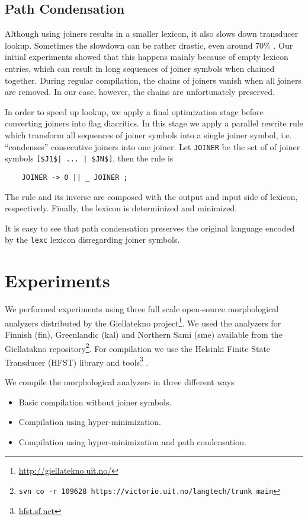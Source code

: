 \documentclass[11pt]{article}
\begin{document}
\subsection{Path Condensation}

Although using joiners results in a smaller lexicon, it also slows down transducer lookup. Sometimes the slowdown can be rather drastic, even around 70\% \cite{drobac2014}.  Our initial experiments showed that this happens mainly because of empty lexicon entries, which can result in long sequences of joiner symbols when chained together. During regular compilation, the chains of joiners vanish when all joiners are removed. In our case, however, the chains are unfortunately preserved.

In order to speed up lookup, we apply a final optimization stage before converting joiners into flag diacritics. In this stage we apply a parallel rewrite rule which transform all sequences of joiner symbols into a single joiner symbol, i.e. ``condenses'' consecutive joiners into one joiner. Let {\tt JOINER} be the set of of joiner symbols {\tt [\$J1\$| ... | \$JN\$]}, then the rule is
\begin{verbatim} 
    JOINER -> 0 || _ JOINER ;
\end{verbatim}
The rule and its inverse are composed with the output and input side of lexicon, respectively. Finally, the lexicon is determinized and minimized.

It is easy to see that path condensation preserves the original language encoded by the {\tt lexc} lexicon disregarding joiner symbols.

\section{Experiments}\label{sec:experiments}
We performed experiments using three full scale open-source
morphological analyzers distributed by the Giellatekno
project\footnote{\url{http://giellatekno.uit.no/}}. We used the analyzers
for Finnish (fin), Greenlandic (kal) and Northern
Sami (sme) available from the Giellatakno repository\footnote{{\tt svn
    co -r 109628 https://victorio.uit.no/langtech/trunk main}}. For
compilation we use the Helsinki Finite State Transducer (HFST) library
and tools\footnote{\url{hfst.sf.net}} \cite{linden2011}.

We compile the morphological analyzers in three different ways

\begin{itemize}
\item Basic compilation without joiner symbols.
\item Compilation using hyper-minimization.
\item Compilation using hyper-minimization and path condensation.
\end{itemize}
\end{document}
